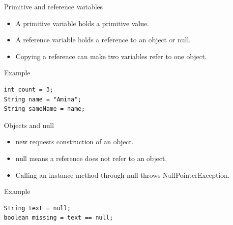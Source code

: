 \documentclass[10pt,aspectratio=169]{beamer}
\begin{document}
\begin{frame}[fragile,t]{Primitive and reference variables}
\begin{itemize}
\item A primitive variable holds a primitive value.
\item A reference variable holds a reference to an object or null.
\item Copying a reference can make two variables refer to one object.
\end{itemize}
\vspace{1mm}\begin{block}{Example}
\begin{lstlisting}
int count = 3;
String name = "Amina";
String sameName = name;
\end{lstlisting}
\end{block}
\end{frame}

\begin{frame}[fragile,t]{Objects and null}
\begin{itemize}
\item new requests construction of an object.
\item null means a reference does not refer to an object.
\item Calling an instance method through null throws NullPointerException.
\end{itemize}
\vspace{1mm}\begin{block}{Example}
\begin{lstlisting}
String text = null;
boolean missing = text == null;
\end{lstlisting}
\end{block}
\end{frame}
\end{document}
